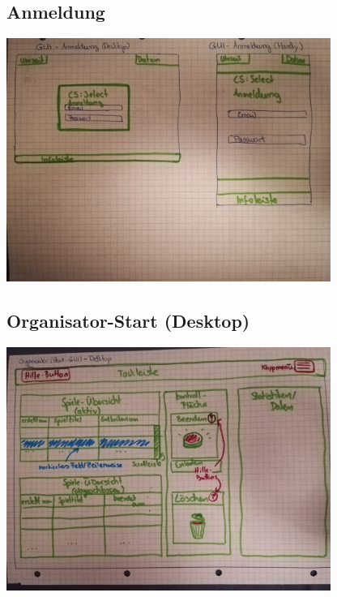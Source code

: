 \documentclass[a4paper]{scrreprt}
\begin{document}
    \subsection{Anmeldung}
        \centering
        \includegraphics[width=400px]{../pictures/1_Anmeldung.jpg}
    \subsection{Organisator-Start (Desktop)}
        \centering
        \includegraphics[width=400px]{../pictures/2_Organisator.jpg}
\end{document}
